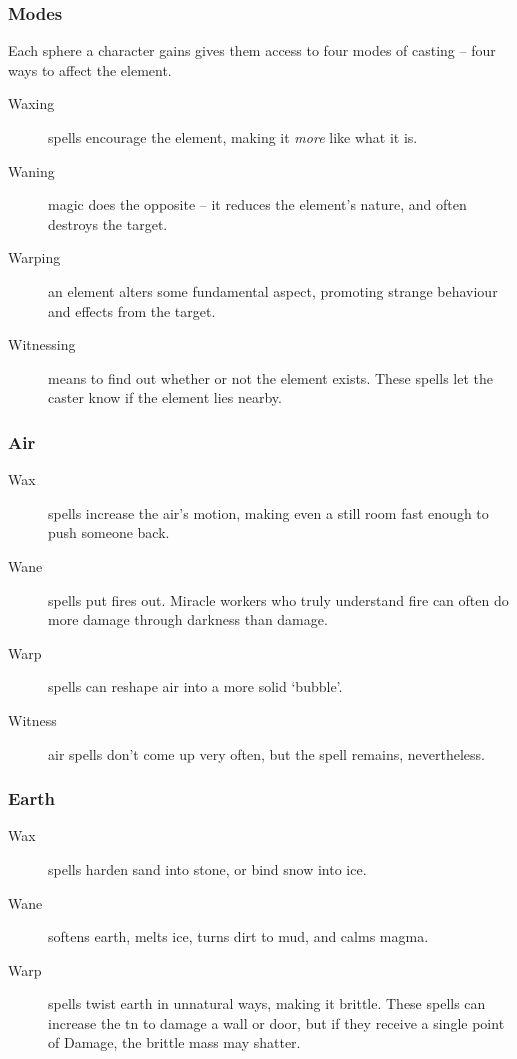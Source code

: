 \begin{multicols}{2}
\subsubsection{Modes}
Each sphere a character gains gives them access to four modes of casting -- four ways to affect the element.

\begin{description}
  \item[Waxing]
  spells encourage the element, making it \emph{more} like what it is.
  \item[Waning]
  magic does the opposite -- it reduces the element's nature, and often destroys the target.
  \item[Warping]
  an element alters some fundamental aspect, promoting strange behaviour and effects from the target.
  \item[Witnessing]
  means to find out whether or not the element exists.
  These spells let the caster know if the element lies nearby.
\end{description}

\subsubsection{Air}

\begin{description}
  \item[Wax]
  spells increase the air's motion, making even a still room fast enough to push someone back.
  \item[Wane]
  spells put fires out.
  Miracle workers who truly understand fire can often do more damage through darkness than damage.
  \item[Warp]
  spells can reshape air into a more solid `bubble'.
  \item[Witness]
  air spells don't come up very often, but the spell remains, nevertheless.
\end{description}

\subsubsection{Earth}

\begin{description}
  \item[Wax]
  spells harden sand into stone, or bind snow into ice.
  \item[Wane]
  softens earth, melts ice, turns dirt to mud, and calms magma.
  \item[Warp]
  spells twist earth in unnatural ways, making it brittle.
  These spells can increase the \gls{tn} to damage a wall or door, but if they receive a single point of Damage, the brittle mass may shatter.
\end{description}


\end{multicols}
